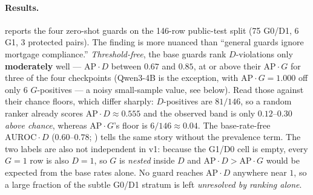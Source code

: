 \paragraph{Results.}  reports the four zero-shot guards on the 146-row public-test
split (75 G0/D1, 6 G1, 3 protected pairs). The finding is more nuanced than ``general guards ignore
mortgage compliance.'' \emph{Threshold-free}, the base guards rank $D$-violations only
\textbf{moderately} well --- $\text{AP}\cdot D$ between $0.67$ and $0.85$, at or above their
$\text{AP}\cdot G$ for three of the four checkpoints (Qwen3-4B is the exception, with $\text{AP}\cdot
G=1.000$ off only $6$ $G$-positives --- a noisy small-sample value, see below). Read those against
their chance floors, which differ sharply: $D$-positives are $81/146$, so a random ranker already scores
$\text{AP}\cdot D\approx0.555$ and the observed band is only $0.12$--$0.30$ \emph{above chance}, whereas
$\text{AP}\cdot G$'s floor is $6/146\approx0.04$. The base-rate-free
$\text{AUROC}\cdot D$ ($0.60$--$0.78$; ) tells the same story without the prevalence
term. The two labels are also not independent in v1: because the G1/D0 cell is empty,
every $G{=}1$ row is also $D{=}1$, so $G$ is \emph{nested} inside $D$ and
$\text{AP}\cdot D>\text{AP}\cdot G$ would be expected from the base rates alone. No guard reaches
$\text{AP}\cdot D$ anywhere near $1$, so a large fraction of the subtle G0/D1 stratum is left
\emph{unresolved by ranking alone}.


